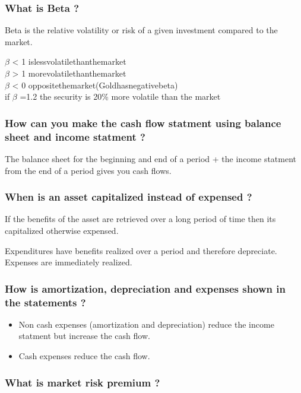 \documentclass[11pt]{scrartcl} %
\begin{document}
\subsubsection{What is Beta ?}

Beta is the relative volatility or risk of a given investment compared to the market.

$\beta$ < 1 is\:less\:volatile\:than\:the\:market \\
$\beta$ > 1 more\:volatile\:than\:the\:market \\
$\beta$ < 0 opposite\:the\:market\:(Gold\:has\:negative\:beta) \\

if $\beta$ =1.2 the security is 20\% more volatile than the market

\subsubsection{How can you make the cash flow statment using balance sheet and income statment ?}

The balance sheet for the beginning and end of a period + the income statment from the end of a period gives you cash flows.

\subsubsection{When is an asset capitalized instead of expensed ?}

If the benefits of the asset are retrieved over a long period of time then its capitalized otherwise expensed.

Expenditures have benefits realized over a period and therefore depreciate. Expenses are immediately realized.

\subsubsection{How is amortization, depreciation and expenses shown in the statements ?}

\begin{itemize}
	\item Non cash expenses (amortization and depreciation) reduce the income statment but increase the cash flow.
	\item Cash expenses reduce the cash flow.
\end{itemize}

\subsubsection{What is market risk premium ?}
\end{document}
